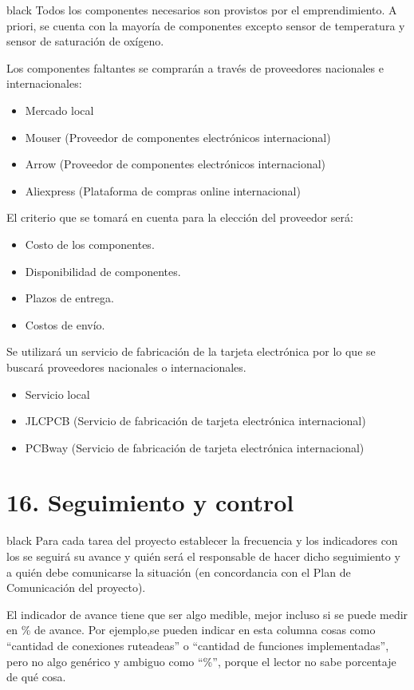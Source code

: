 \documentclass[11pt]{charter}
\begin{document}
\begin{consigna}{black}
Todos los componentes necesarios son provistos por el emprendimiento. A priori, se cuenta con la mayoría de componentes excepto sensor de temperatura y sensor de saturación de oxígeno.

Los componentes faltantes se comprarán a través de proveedores nacionales e internacionales:
\begin{itemize} 
\item Mercado local
\item Mouser (Proveedor de componentes electrónicos internacional)
\item Arrow (Proveedor de componentes electrónicos internacional)
\item Aliexpress (Plataforma de compras online internacional)
\end{itemize}

El criterio que se tomará en cuenta para la elección del proveedor será:
\begin{itemize} 
\item Costo de los componentes.
\item Disponibilidad de componentes.
\item Plazos de entrega.
\item Costos de envío.
\end{itemize}

Se utilizará un servicio de fabricación de la tarjeta electrónica por lo que se buscará proveedores nacionales o internacionales.
\begin{itemize} 
\item Servicio local 
\item JLCPCB (Servicio de fabricación de tarjeta electrónica internacional)
\item PCBway (Servicio de fabricación de tarjeta electrónica internacional)
\end{itemize}

\end{consigna}
\vspace{-15px}
\section{16. Seguimiento y control}
\label{sec:seguimiento}

\begin{consigna}{black}
Para cada tarea del proyecto establecer la frecuencia y los indicadores con los se seguirá su avance y quién será el responsable de hacer dicho seguimiento y a quién debe comunicarse la situación (en concordancia con el Plan de Comunicación del proyecto).

El indicador de avance tiene que ser algo medible, mejor incluso si se puede medir en \% de avance. Por ejemplo,se pueden indicar en esta columna cosas como ``cantidad de conexiones ruteadeas'' o ``cantidad de funciones implementadas'', pero no algo genérico y ambiguo como ``\%'', porque el lector no sabe porcentaje de qué cosa.

\end{consigna}
\end{document}
